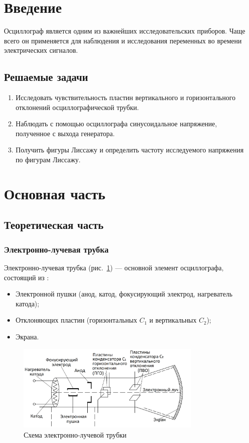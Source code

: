 \section{Введение}

Осциллограф является одним из важнейших исследовательских приборов. Чаще всего он применяется для наблюдения и исследования переменных во времени электрических сигналов.

\subsection{Решаемые задачи}

\begin{enumerate}
    \item Исследовать чувствительность пластин вертикального и горизонтального отклонений осциллографической трубки.
    \item Наблюдать с помощью осциллографа синусоидальное напряжение, полученное с выхода генератора.
    \item Получить фигуры Лиссажу и определить частоту исследуемого напряжения по фигурам Лиссажу.
\end{enumerate}

\section{Основная часть}

\subsection{Теоретическая часть}

\subsubsection{Электронно-лучевая трубка}

Электронно-лучевая трубка (рис.~\ref{fig:Scheme1}) — основной элемент осциллографа, состоящий из :
\begin{itemize}
\item Электронной пушки (анод, катод, фокусирующий электрод, нагреватель катода);
\item Отклоняющих пластин (горизонтальных $C_1$ и вертикальных $C_2$);
\item Экрана.
\end{itemize}

\begin{figure}[H]
\centering
\includegraphics[width=0.8\textwidth]{Scheme1.png}
\caption{Схема электронно-лучевой трубки}
\label{fig:Scheme1}
\end{figure}

